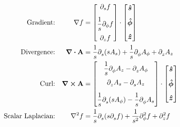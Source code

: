         \begin{align*}
        \text{Gradient:}&&%
            \nabla f &= 
            \qty[
            \begin{matrix}
                \mathlarger{\partial_{s}f}
                \\[0.3 cm]
                \mathlarger{\frac{1}{s} \partial_{\phi}f}
                \\[0.3 cm]
                \mathlarger{\partial_{z}f}
            \end{matrix}]
            \cdot
            \qty[
            \begin{matrix}
                \e{s}
                \\[0.3 cm]
                \e{\phi}
                \\[0.3 cm]
                \e{z}
            \end{matrix}]
            \\
        \text{Divergence:}&&%
            \div\vb{A} &= \oo{s}\pder*{s}\qty(s A_s) + \oo{s}\pder*{\phi}A_\phi  + \pder*{z}A_z
            \\
        \text{Curl:}&&%
            \curl \vb{A} &= 
            \qty[ 
            \begin{matrix}
                \mathlarger{\oo{s} \pder*{\phi}A_z - \pder*{z}A_\phi} 
                \\[0.3 cm]
                \mathlarger{\pder*{z}A_s - \pder*{s}A_z}
                \\[0.3 cm]
                \mathlarger{\oo{s}\pder*{s}\qty(s A_\phi) - \oo{s}\pder*{\phi}A_s}
            \end{matrix}]
            \cdot\qty[
            \begin{matrix}
                \e{s}
                \\[0.3 cm]
                \e{\phi}
                \\[0.3 cm]
                \e{z}
            \end{matrix}]
            \\
            \text{Scalar Laplacian:}&&%
            \nabla^2 f
            &=\oo{s}\pder*{s}\qty(s\pder*{s}f) + \oo{{s}^2}\pder*[2]{\phi}f + \pder*[2]{z}f 
        \end{align*}
        \length
%